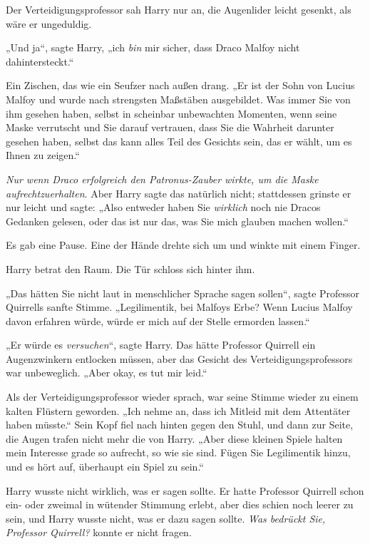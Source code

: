 {Der Verteidigungsprofessor sah Harry nur an, die Augenlider leicht gesenkt, als wäre er ungeduldig.

„Und ja“, sagte Harry, „ich \emph{bin} mir sicher, dass Draco Malfoy nicht dahintersteckt.“

Ein Zischen, das wie ein Seufzer nach außen drang. „Er ist der Sohn von Lucius Malfoy und wurde nach strengsten Maßstäben ausgebildet. Was immer Sie von ihm gesehen haben, selbst in scheinbar unbewachten Momenten, wenn seine Maske verrutscht und Sie darauf vertrauen, dass Sie die Wahrheit darunter gesehen haben, selbst das kann alles Teil des Gesichts sein, das er wählt, um es Ihnen zu zeigen.“

\emph{Nur wenn Draco erfolgreich den Patronus-Zauber wirkte, um die Maske aufrechtzuerhalten}. Aber Harry sagte das natürlich nicht; stattdessen grinste er nur leicht und sagte: „Also entweder haben Sie \emph{wirklich} noch nie Dracos Gedanken gelesen, oder das ist nur das, was Sie mich glauben machen wollen.“

Es gab eine Pause. Eine der Hände drehte sich um und winkte mit einem Finger.

Harry betrat den Raum. Die Tür schloss sich hinter ihm.

„Das hätten Sie nicht laut in menschlicher Sprache sagen sollen“, sagte Professor Quirrells sanfte Stimme. „Legilimentik, bei Malfoys Erbe? Wenn Lucius Malfoy davon erfahren würde, würde er mich auf der Stelle ermorden lassen.“

„Er würde es \emph{versuchen}“, sagte Harry. Das hätte Professor Quirrell ein Augenzwinkern entlocken müssen, aber das Gesicht des Verteidigungsprofessors war unbeweglich. „Aber okay, es tut mir leid.“

Als der Verteidigungsprofessor wieder sprach, war seine Stimme wieder zu einem kalten Flüstern geworden. „Ich nehme an, dass ich Mitleid mit dem Attentäter haben müsste.“ Sein Kopf fiel nach hinten gegen den Stuhl, und dann zur Seite, die Augen trafen nicht mehr die von Harry. „Aber diese kleinen Spiele halten mein Interesse grade so aufrecht, so wie sie sind. Fügen Sie Legilimentik hinzu, und es hört auf, überhaupt ein Spiel zu sein.“

Harry wusste nicht wirklich, was er sagen sollte. Er hatte Professor Quirrell schon ein- oder zweimal in wütender Stimmung erlebt, aber dies schien noch leerer zu sein, und Harry wusste nicht, was er dazu sagen sollte. \emph{Was bedrückt Sie, Professor Quirrell?} konnte er nicht fragen.

}
